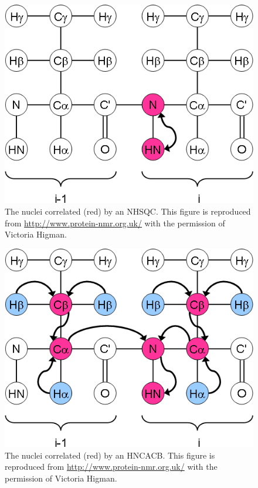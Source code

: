 \begin{figure}
  \includegraphics[scale=0.75]{figures/ccpn_nhsqc}
  \caption[The nuclei correlated by an NHSQC.]
          {The nuclei correlated (red) by an NHSQC.
           This figure is reproduced from \url{http://www.protein-nmr.org.uk/}
           with the permission of Victoria Higman.}
  \label{ccpn_nhsqc}
\end{figure}

\begin{figure}
  \includegraphics[scale=0.75]{figures/ccpn_hncacb}
  \caption[The nuclei correlated by an HNCACB.]
          {The nuclei correlated (red) by an HNCACB.
           This figure is reproduced from \url{http://www.protein-nmr.org.uk/}
           with the permission of Victoria Higman.}
  \label{ccpn_hncacb}
\end{figure}

